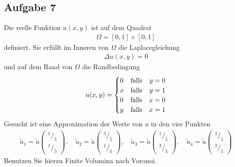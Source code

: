 \documentclass[
	final,
	a4paper,
	oneside,
	parskip=full,
	headings=standardclasses,
	headings=big,
	pointednumbers
]{scrartcl}
\begin{document}
    \subsection*{Aufgabe 7}
    Die reelle Funktion $u{\left(x,  y\right)}$ ist auf dem Quadrat
    \begin{align*}
        \Omega = \left[ 0, 1 \right] \times \left[ 0, 1 \right]
    \end{align*}
    definiert. Sie erfüllt im Inneren von $\Omega$ die Laplacegleichung
    \begin{align*}
        \Delta u{\left(x,  y\right)} = 0
    \end{align*}
    und auf dem Rand von $\Omega$ die Randbedingung
    \begin{align*}
        u{\left(x,  y\right)} =
        \setlength{\arraycolsep}{0pt}
        \renewcommand{\arraystretch}{1.2}
        \left\{
            \begin{array}{l @{\quad} l r l}
                0 & \text{falls\quad} & y &{}= 0 \\
                x & \text{falls\quad} & y &{}= 1 \\
                0 & \text{falls\quad} & x &{}= 0 \\
                y & \text{falls\quad} & x &{}= 1
            \end{array}
        \right.
    \end{align*}
    Gesucht ist eine Approximation der Werte von $u$ in den vier Punkten
    \begin{align*}
        \tilde{u}_1 = \tilde{u}{\begin{pmatrix}
            {^1/_5} \\ {^1/_5}
        \end{pmatrix}},\quad
        \tilde{u}_2 = \tilde{u}{\begin{pmatrix}
            {^3/_5} \\ {^1/_5}
        \end{pmatrix}},\quad
        \tilde{u}_3 = \tilde{u}{\begin{pmatrix}
            {^1/_5} \\ {^3/_5}
        \end{pmatrix}},\quad
        \tilde{u}_4 = \tilde{u}{\begin{pmatrix}
            {^3/_5} \\ {^3/_5}
        \end{pmatrix}}
    \end{align*}
    Benutzen Sie hierzu Finite Volumina nach Voronoi.
\end{document}
